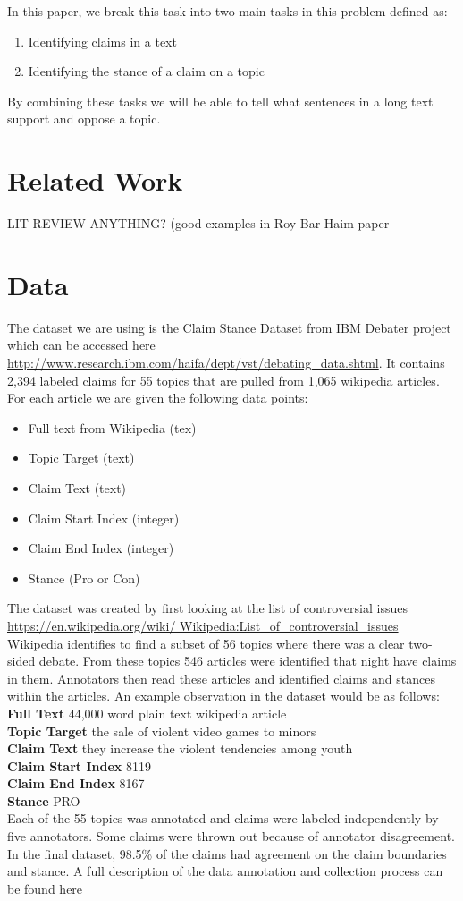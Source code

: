\documentclass[11pt,a4paper]{article}
\begin{document}
In this paper, we break this task into two main tasks in this problem defined as:
\begin{enumerate}
\item Identifying claims in a text
\item Identifying the stance of a claim on a topic
\end{enumerate}
By combining these tasks we will be able to tell what sentences in a long text support and oppose a topic.
\section{Related Work}
\cite{bar2017stance}
LIT REVIEW ANYTHING? (good examples in Roy Bar-Haim paper \\
\section{Data}
The dataset we are using is the Claim Stance Dataset from IBM Debater project which can be accessed here \url{http://www.research.ibm.com/haifa/dept/vst/debating_data.shtml}​.  It contains 2,394 labeled claims for 55 topics that are pulled from 1,065 wikipedia articles.  For each article we are given the following data points:

\begin{itemize}
\item Full text from Wikipedia (tex)
\item Topic Target (text)
\item Claim Text (text)
\item Claim Start Index (integer)
\item Claim End Index (integer)
\item Stance (Pro or Con)
\end{itemize}

The dataset was created by first looking at the list of controversial issues \url{https://en.wikipedia.org/wiki/
Wikipedia:List_of_controversial_issues} Wikipedia identifies to find a subset of 56 topics where there was a clear two-sided debate.  From these topics 546 articles were identified that night have claims in them.  Annotators then read these articles and identified claims and stances within the articles.  An example observation in the dataset would be as follows: \\
\textbf{Full Text} 44,000 word plain text wikipedia article\\
\textbf{Topic Target} the sale of violent video games to minors\\
\textbf{Claim Text} they increase the violent tendencies among youth\\
\textbf{Claim Start Index} 8119\\
\textbf{Claim End Index} 8167\\
\textbf{Stance} PRO\\
Each of the 55 topics was annotated and claims were labeled independently by five annotators.  Some claims were thrown out because of annotator disagreement.  In the final dataset, 98.5\% of the claims had agreement on the claim boundaries and stance.  A full description of the data annotation and collection process can be found here \cite{toledo2016expert}
\end{document}
